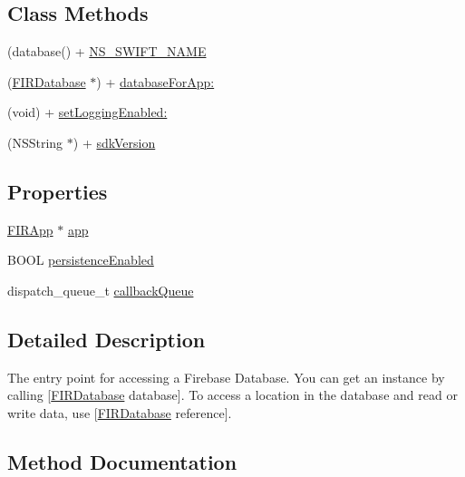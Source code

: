 \subsection*{Class Methods}
\begin{DoxyCompactItemize}
\item 
(database() + \hyperlink{interface_f_i_r_database_a4aff0dd4db5a51021a84f2d97ee00f67}{N\+S\+\_\+\+S\+W\+I\+F\+T\+\_\+\+N\+A\+M\+E}
\item 
(\hyperlink{interface_f_i_r_database}{F\+I\+R\+Database} $\ast$) + \hyperlink{interface_f_i_r_database_aee1fc41abae6cf11b8a7f2214ebfd551}{database\+For\+App\+:}
\item 
(void) + \hyperlink{interface_f_i_r_database_add018db6d76362436734f66daa471256}{set\+Logging\+Enabled\+:}
\item 
(N\+S\+String $\ast$) + \hyperlink{interface_f_i_r_database_a6f4003c06264fdb9f08dc038ab3b05af}{sdk\+Version}
\end{DoxyCompactItemize}
\subsection*{Properties}
\begin{DoxyCompactItemize}
\item 
\hyperlink{interface_f_i_r_app}{F\+I\+R\+App} $\ast$ \hyperlink{interface_f_i_r_database_aba424f14e82a66bb8ef815470efaa205}{app}
\item 
B\+O\+O\+L \hyperlink{interface_f_i_r_database_af82d07aa667557f4e926f05612130bb2}{persistence\+Enabled}
\item 
dispatch\+\_\+queue\+\_\+t \hyperlink{interface_f_i_r_database_ae9d35e369f0b50f6a0d890dba953f9d3}{callback\+Queue}
\end{DoxyCompactItemize}


\subsection{Detailed Description}
The entry point for accessing a Firebase Database. You can get an instance by calling \mbox{[}\hyperlink{interface_f_i_r_database}{F\+I\+R\+Database} database\mbox{]}. To access a location in the database and read or write data, use \mbox{[}\hyperlink{interface_f_i_r_database}{F\+I\+R\+Database} reference\mbox{]}. 

\subsection{Method Documentation}
\hypertarget{interface_f_i_r_database_aee1fc41abae6cf11b8a7f2214ebfd551}{}
